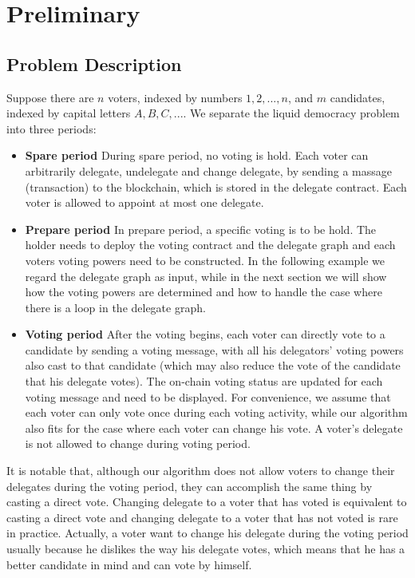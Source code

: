 \section{Preliminary}
\subsection{Problem Description}
Suppose there are $n$ voters, indexed by numbers $1,2,...,n$, and $m$ candidates, indexed by capital letters $A,B,C,...$. We separate the liquid democracy  problem into three periods:
\begin{itemize}
	\item \textbf{Spare period} During spare period, no voting  is hold. Each voter can arbitrarily delegate, undelegate and change delegate, by sending a massage (transaction) to the blockchain, which is stored in the delegate contract. Each voter is allowed to appoint at most one delegate. 
	\item \textbf{Prepare period}
	In prepare period, a specific voting is to be hold. The holder needs to deploy the voting contract and the delegate graph and each voters voting powers need to be constructed. In the following example we regard the delegate graph as input,  while in the next section we will show how the voting powers are determined and how to handle the case where there is a loop in the delegate graph. %
	\item \textbf{Voting period} After the voting begins, each voter can directly vote to a candidate by sending a voting message, with all his delegators' voting powers also cast to that candidate (which may also reduce the vote of the candidate that his delegate votes). The on-chain voting status are updated for each voting message and need to be displayed. For convenience, we assume that each voter can only vote once during each voting activity, while our algorithm also fits for the case where each voter can change his vote. A voter's delegate is not allowed to change during voting period.
\end{itemize}
It is notable that, although our algorithm does not allow voters to change their delegates during the voting period, they can accomplish the same thing by casting a direct vote.  Changing delegate to a voter that has voted is equivalent to casting a direct vote and changing delegate to a voter that has not voted is rare in practice. Actually, a voter want to change his delegate during the voting period usually because he dislikes the way his delegate votes, which means that he has a better candidate in mind and can vote by himself.

